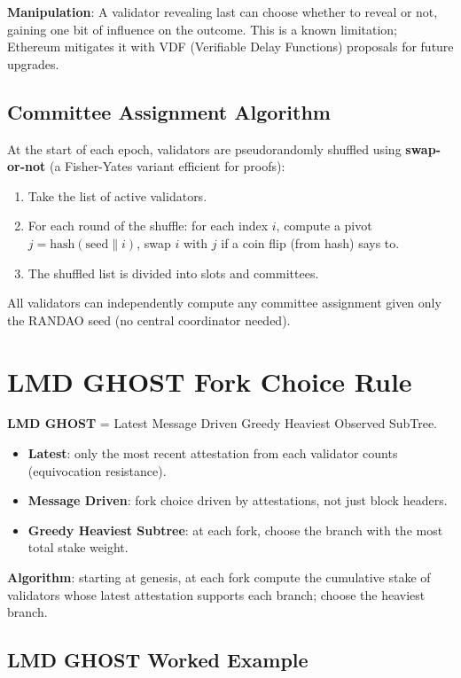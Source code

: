 \documentclass[12pt,a4paper,openany]{book}
\theoremstyle{definition}
\theoremstyle{plain}
\theoremstyle{remark}
\begin{document}
\textbf{Manipulation}: A validator revealing last can choose whether
to reveal or not, gaining one bit of influence on the outcome.  This is
a known limitation; Ethereum mitigates it with VDF (Verifiable Delay
Functions) proposals for future upgrades.

\subsection{Committee Assignment Algorithm}

At the start of each epoch, validators are pseudorandomly shuffled
using \textbf{swap-or-not} (a Fisher-Yates variant efficient for
proofs):
\begin{enumerate}
  \item Take the list of active validators.
  \item For each round of the shuffle: for each index $i$, compute a
        pivot $j = \mathrm{hash}(\text{seed}\|i)$, swap $i$ with $j$
        if a coin flip (from hash) says to.
  \item The shuffled list is divided into slots and committees.
\end{enumerate}

All validators can independently compute any committee assignment given
only the RANDAO seed (no central coordinator needed).

\section{LMD GHOST Fork Choice Rule}

\textbf{LMD GHOST} = Latest Message Driven Greedy Heaviest Observed
SubTree.

\begin{itemize}
  \item \textbf{Latest}: only the most recent attestation from each
        validator counts (equivocation resistance).
  \item \textbf{Message Driven}: fork choice driven by attestations, not
        just block headers.
  \item \textbf{Greedy Heaviest Subtree}: at each fork, choose the branch
        with the most total stake weight.
\end{itemize}

\textbf{Algorithm}: starting at genesis, at each fork compute the
cumulative stake of validators whose latest attestation supports each
branch; choose the heaviest branch.

\subsection{LMD GHOST Worked Example}
\end{document}

